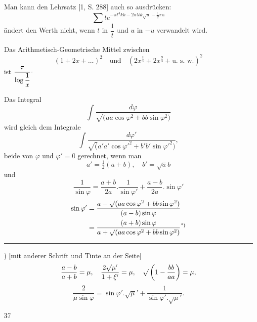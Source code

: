 \par\indent Man kann den Lehrsatz [1, S. 288] auch so ausdrücken:
\[\sum t e^{-\pi t^4kk-2\pi tt k\surd u-\frac12\pi u}\]
\noindent ändert den Werth nicht, wenn $t$ in $\dfrac1t$ und $u$ in $-u$ verwandelt wird.
\ClosingRule
\par\indent Das Arithmetisch-Geometrische Mittel zwischen
\[(1+2x+\ldots)^2\quad\text{und}\quad\left(2x^{\frac14}+2x^{\frac94}+\text{u. s. w.}\right)^2\]
\noindent ist $\dfrac\pi{\log\dfrac1x}\mathpunct{\raisebox{.5ex}{.}}$
\ClosingRule
\noindent {\small[S. 41]}\par
\par\indent Das Integral
\[\int\frac{d\varphi}{\surd(aa\cos\varphi^2+bb\sin\varphi^2)}\]
\noindent wird gleich dem Integrale
\[\int\frac{d\varphi'}{\surd(a'a'\cos\varphi'^2+b'b'\sin\varphi'^2)},\]
\noindent beide von $\varphi$ und $\varphi'=0$ gerechnet, wenn man
\[a'=\tfrac12(a+b),\quad b'=\surd ab\]
\noindent und
\[\frac1{\sin\varphi}=\frac{a+b}{2a}.\frac1{\sin\varphi'}+\frac{a-b}{2a}.\sin\varphi'\]
\[\begin{aligned}
\sin\varphi'&=\frac{a-\surd(aa\cos\varphi^2+bb\sin\varphi^2)}{(a-b)\sin\varphi}\\
&=\frac{(a+b)\sin\varphi}{a+\surd(aa\cos\varphi^2+bb\sin\varphi^2)}\text{\textsuperscript{*)}}
\end{aligned}\]
\noindent [setzt.]
\par\smallskip\noindent\rule{.25\linewidth}{.4pt}\par
{\small
\par\indent *) [mit anderer Schrift und Tinte an der Seite]
\[\frac{a-b}{a+b}=\mu,\quad\frac{2\surd\mu'}{1+\xi'}=\mu,\quad\surd\left(1-\frac{bb}{aa}\right)=\mu,\]
\[\frac2{\mu\sin\varphi}=\sin\varphi'.\surd\mu'+\frac1{\sin\varphi'.\surd\mu'}.\]
\par}
\par\smallskip{}\hfill 37\par

\clearpage
\endgroup
